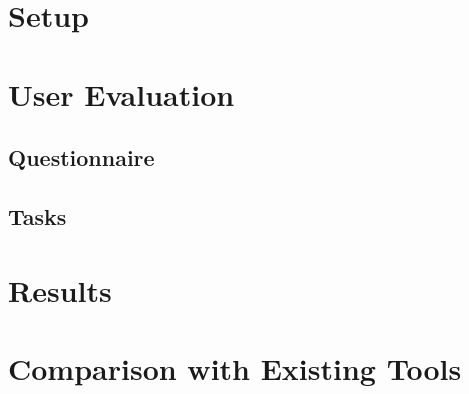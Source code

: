 \section{Setup}

\section{User Evaluation}

\subsection{Questionnaire}

\subsection{Tasks}

\section{Results}

\section{Comparison with Existing Tools}





